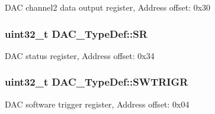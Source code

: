 D\-A\-C channel2 data output register, Address offset\-: 0x30 \hypertarget{struct_d_a_c___type_def_a1d3fd83d6ed8b2d90b471db4509b0e70}{
\subsubsection[{S\-R}]{ uint32\-\_\-t D\-A\-C\-\_\-\-Type\-Def\-::\-S\-R}}\label{struct_d_a_c___type_def_a1d3fd83d6ed8b2d90b471db4509b0e70}
D\-A\-C status register, Address offset\-: 0x34 \hypertarget{struct_d_a_c___type_def_a4ccb66068a1ebee1179574dda20206b6}{
\subsubsection[{S\-W\-T\-R\-I\-G\-R}]{ uint32\-\_\-t D\-A\-C\-\_\-\-Type\-Def\-::\-S\-W\-T\-R\-I\-G\-R}}\label{struct_d_a_c___type_def_a4ccb66068a1ebee1179574dda20206b6}
D\-A\-C software trigger register, Address offset\-: 0x04 

